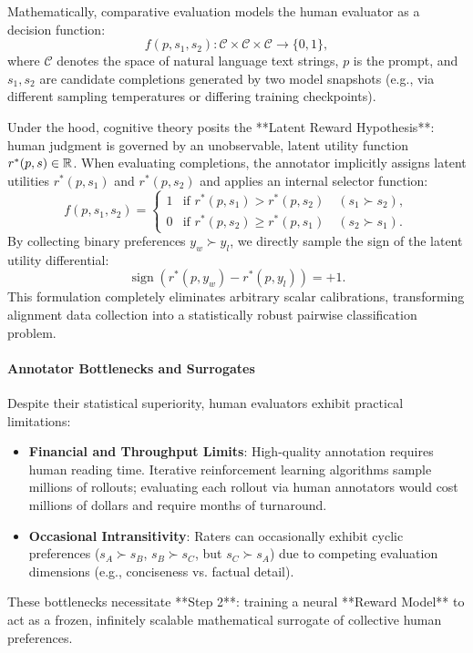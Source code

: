 \documentclass[../../main.tex]{subfiles}
\begin{document}
Mathematically, comparative evaluation models the human evaluator as a decision function:
\begin{equation}
f(p, s_1, s_2): \mathcal{C} \times \mathcal{C} \times \mathcal{C} \longrightarrow \{0, 1\},
\end{equation}
where $\mathcal{C}$ denotes the space of natural language text strings, $p$ is the prompt, and $s_1, s_2$ are candidate completions generated by two model snapshots (e.g., via different sampling temperatures or differing training checkpoints).

Under the hood, cognitive theory posits the **Latent Reward Hypothesis**: human judgment is governed by an unobservable, latent utility function $r^*(p, s) \in \mathbb{R}$. When evaluating completions, the annotator implicitly assigns latent utilities $r^*(p, s_1)$ and $r^*(p, s_2)$ and applies an internal selector function:
\begin{equation}
f(p, s_1, s_2) = \begin{cases}
1 & \text{if } r^*(p, s_1) > r^*(p, s_2) \quad (s_1 \succ s_2), \\
0 & \text{if } r^*(p, s_2) \ge r^*(p, s_1) \quad (s_2 \succ s_1).
\end{cases}
\end{equation}
By collecting binary preferences $y_w \succ y_l$, we directly sample the sign of the latent utility differential:
\begin{equation}
\operatorname{sign}\left(r^*(p, y_w) - r^*(p, y_l)\right) = +1.
\end{equation}
This formulation completely eliminates arbitrary scalar calibrations, transforming alignment data collection into a statistically robust pairwise classification problem.

\paragraph{Annotator Bottlenecks and Surrogates}
Despite their statistical superiority, human evaluators exhibit practical limitations:
\begin{itemize}
    \item \textbf{Financial and Throughput Limits}: High-quality annotation requires human reading time. Iterative reinforcement learning algorithms sample millions of rollouts; evaluating each rollout via human annotators would cost millions of dollars and require months of turnaround.
    \item \textbf{Occasional Intransitivity}: Raters can occasionally exhibit cyclic preferences ($s_A \succ s_B$, $s_B \succ s_C$, but $s_C \succ s_A$) due to competing evaluation dimensions (e.g., conciseness vs. factual detail).
\end{itemize}
These bottlenecks necessitate **Step 2**: training a neural **Reward Model** to act as a frozen, infinitely scalable mathematical surrogate of collective human preferences.
\end{document}
